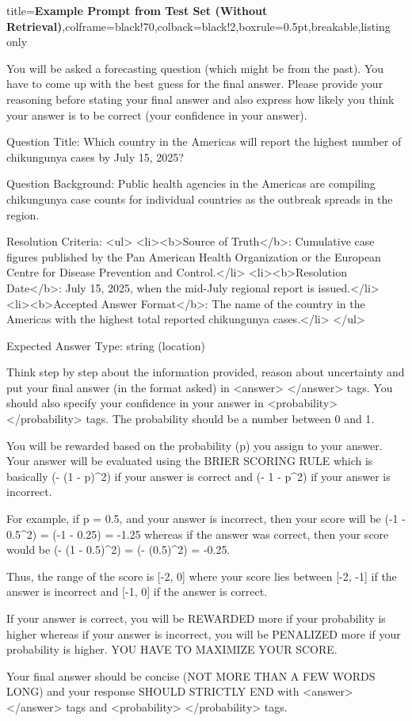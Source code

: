 \begin{tcblisting}{title={\textbf{Example Prompt from Test Set (Without Retrieval)}},colframe=black!70,colback=black!2,boxrule=0.5pt,breakable,listing only}

You will be asked a forecasting question (which might be from the past).
You have to come up with the best guess for the final answer.
Please provide your reasoning before stating your final answer and also express how likely you think your answer is to be correct (your confidence in your answer).

Question Title:
Which country in the Americas will report the highest number of chikungunya cases by July 15, 2025?

Question Background:
Public health agencies in the Americas are compiling chikungunya case counts for individual countries as the outbreak spreads in the region.

Resolution Criteria:
<ul>
  <li><b>Source of Truth</b>: Cumulative case figures published by the Pan American Health Organization or the European Centre for Disease Prevention and Control.</li>
  <li><b>Resolution Date</b>: July 15, 2025, when the mid-July regional report is issued.</li>
  <li><b>Accepted Answer Format</b>: The name of the country in the Americas with the highest total reported chikungunya cases.</li>
</ul>

Expected Answer Type:
string (location)

Think step by step about the information provided, reason about uncertainty and put your final answer (in the format asked) in <answer> </answer> tags.
You should also specify your confidence in your answer in <probability> </probability> tags.
The probability should be a number between 0 and 1.

You will be rewarded based on the probability (p) you assign to your answer.
Your answer will be evaluated using the BRIER SCORING RULE which is basically (- (1 - p)^2) if your answer is correct and (- 1 - p^2) if your answer is incorrect.

For example, if p = 0.5, and your answer is incorrect, then your score will be (-1 - 0.5^2) = (-1 - 0.25) = -1.25
whereas if the answer was correct, then your score would be (- (1 - 0.5)^2) = (- (0.5)^2) = -0.25.

Thus, the range of the score is [-2, 0] where your score lies between [-2, -1] if the answer is incorrect and [-1, 0] if the answer is correct.

If your answer is correct, you will be REWARDED more if your probability is higher whereas if your answer is incorrect, you will be PENALIZED more if your probability is higher.
YOU HAVE TO MAXIMIZE YOUR SCORE.

Your final answer should be concise (NOT MORE THAN A FEW WORDS LONG) and your response SHOULD STRICTLY END with <answer> </answer> tags and <probability> </probability> tags.


\end{tcblisting}



